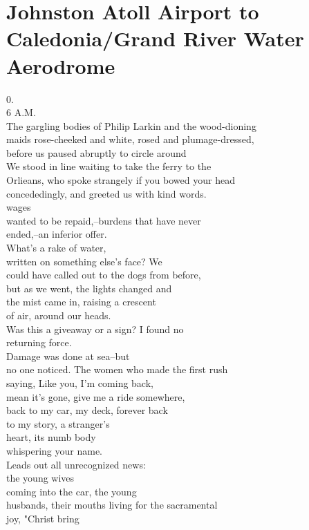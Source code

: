 \documentclass[smalldemyvopaper,11pt,twoside,onecolumn,openright,extrafontsizes]{memoir}
\begin{document}
\chapter{Johnston Atoll Airport to Caledonia/Grand River Water Aerodrome}
0.
\\6 A.M.
\\The gargling bodies of Philip Larkin and the wood-dioning
\\maids rose-cheeked and white, rosed and plumage-dressed,
\\before us paused abruptly to circle around
\\We stood in line waiting to take the ferry to the
\\Orlieans, who spoke strangely if you bowed your head
\\concededingly, and greeted us with kind words.
\\wages
\\wanted to be repaid,--burdens that have never
\\ended,--an inferior offer.
\\What's a rake of water,
\\written on something else's face? We
\\could have called out to the dogs from before,
\\but as we went, the lights changed and
\\the mist came in, raising a crescent
\\of air, around our heads.
\\Was this a giveaway or a sign? I found no
\\returning force.
\\Damage was done at sea--but
\\no one noticed. The women who made the first rush
\\saying, Like you, I'm coming back,
\\mean it's gone, give me a ride somewhere,
\\back to my car, my deck, forever back
\\to my story, a stranger's
\\heart, its numb body
\\whispering your name.
\\Leads out all unrecognized news:
\\the young wives
\\coming into the car, the young
\\husbands, their mouths living for the sacramental
\\joy, "Christ bring
\end{document}
